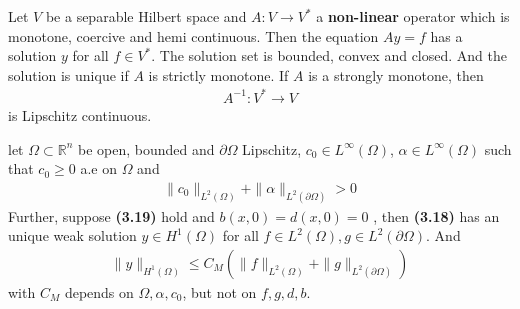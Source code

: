 \begin{theorem}
	Let $V$ be a separable Hilbert space and $A: V \rightarrow V^*$ a \textbf{non-linear} operator which is monotone, coercive and hemi continuous. Then the equation $Ay = f$ has a solution $y$ for all $f \in V^*$. The solution set is bounded, convex and closed. And the solution is unique if $A$ is strictly monotone. If $A$ is a strongly monotone, then 
	\begin{align*}
		A^{-1}: V^* \rightarrow V
	\end{align*}
	is Lipschitz continuous.
\end{theorem}

\begin{theorem}
	let $\Omega \subset \mathbb{R}^n$ be open, bounded and $\partial \Omega$ Lipschitz, $c_0 \in L^\infty(\Omega)$, $\alpha \in L^\infty(\Omega)$ such that $c_0 \ge 0$ a.e on $\Omega$ and
	\begin{align*}
		\|c_0\|_{L^2(\Omega)}+ \|\alpha\|_{L^2(\partial \Omega)} > 0
	\end{align*}
	Further, suppose \textbf{(3.19)} hold and $b(x, 0) = d(x, 0) = 0$ , then \textbf{(3.18)} has an unique weak solution $y \in H^1(\Omega)$ for all $f \in L^2(\Omega), g \in L^2(\partial\Omega)$. And 
	\begin{align*}
		\|y\|_{H^1(\Omega)} \le C_M (\|f\|_{L^2(\Omega)} + \|g\|_{L^2(\partial\Omega)})
	\end{align*}
	with $C_M$ depends on $\Omega, \alpha, c_0$, but not on $f, g, d, b$. 
\end{theorem}
